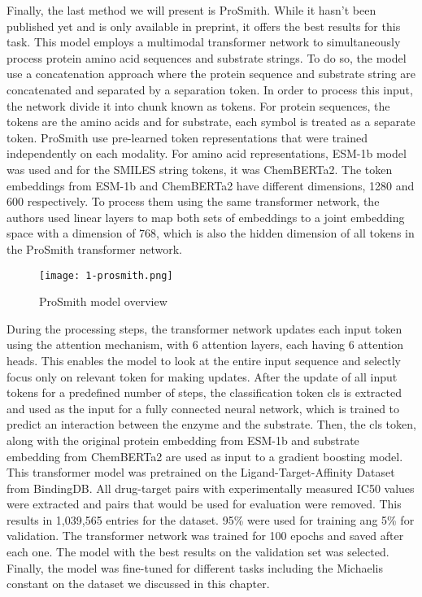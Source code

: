 Finally, the last method we will present is ProSmith. \cite{prosmith} While it hasn't been published yet
and is only available in preprint, it offers the best results for this task. This model employs a multimodal
transformer network to simultaneously process protein amino acid sequences and substrate strings. To do so,
the model use a concatenation approach where the protein sequence and substrate string are concatenated 
and separated by a separation token. In order to process this input, the network divide it into chunk 
known as tokens. For protein sequences, the tokens are the amino acids and for substrate, each symbol is
treated as a separate token. ProSmith use pre-learned token representations that were trained independently
on each modality. For amino acid representations, ESM-1b model was used and for the SMILES string tokens, it
was ChemBERTa2. \cite{esm1,chemberta} The token embeddings from ESM-1b and ChemBERTa2 have different dimensions,
1280 and 600 respectively. To process them using the same transformer network, the authors used linear layers
to map both sets of embeddings to a joint embedding space with a dimension of 768, which is also the hidden
dimension of all tokens in the ProSmith transformer network. 

\begin{figure}
  \centering
  \texttt{[image: 1-prosmith.png]}
  \caption{ProSmith model overview}
  \label{fig:prosmith}
\end{figure}

During the processing steps, the transformer 
network updates each input token using the attention mechanism, with 6 attention layers, each having
6 attention heads. \cite{attention} This enables the model
to look at the entire input sequence and selectly focus only on relevant token for making updates. 
After the update of all input tokens for a predefined number of steps, the classification token cls is
extracted and used as the input for a fully connected neural network, which is trained to predict an
interaction between the enzyme and the substrate. Then, the cls token, along with the original protein 
embedding from ESM-1b and substrate embedding from ChemBERTa2 are used as input to a gradient boosting model.
\cite{xgboost} This transformer model was pretrained on the Ligand-Target-Affinity Dataset from BindingDB.
\cite{bindingdb} All drug-target pairs with experimentally measured IC50 values were extracted and pairs 
that would be used for evaluation were removed. This results in 1,039,565 entries for the dataset. 95\%
were used for training ang 5\% for validation. The transformer network was trained for 100 epochs and saved
after each one. The model with the best results on the validation set was selected. Finally, the model
was fine-tuned for different tasks including the Michaelis constant on the dataset we discussed in this 
chapter.

